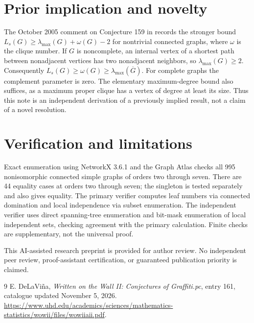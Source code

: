 \documentclass[11pt]{article}
\begin{document}
\section{Prior implication and novelty}
The October 2005 comment on Conjecture 159 in \cite{wow} records the stronger bound $L_s(G)\ge\lambda_{\max}(G)+\omega(G)-2$ for nontrivial connected graphs, where $\omega$ is the clique number. If $G$ is noncomplete, an internal vertex of a shortest path between nonadjacent vertices has two nonadjacent neighbors, so $\lambda_{\max}(G)\ge2$. Consequently $L_s(G)\ge\omega(G)\ge\lambda_{\max}(\overline G)$. For complete graphs the complement parameter is zero. The elementary maximum-degree bound also suffices, as a maximum proper clique has a vertex of degree at least its size. Thus this note is an independent derivation of a previously implied result, not a claim of a novel resolution.
\section{Verification and limitations}
Exact enumeration using NetworkX 3.6.1 and the Graph Atlas checks all 995 nonisomorphic connected simple graphs of orders two through seven. There are 44 equality cases at orders two through seven; the singleton is tested separately and also gives equality. The primary verifier computes leaf numbers via connected domination and local independence via subset enumeration. The independent verifier uses direct spanning-tree enumeration and bit-mask enumeration of local independent sets, checking agreement with the primary calculation. Finite checks are supplementary, not the universal proof.

This AI-assisted research preprint is provided for author review. No independent peer review, proof-assistant certification, or guaranteed publication priority is claimed.
\begin{thebibliography}{9}
 E. DeLaVi\~na, \emph{Written on the Wall II: Conjectures of Graffiti.pc}, entry 161, catalogue updated November 5, 2026. \url{https://www.uhd.edu/academics/sciences/mathematics-statistics/wowii/files/wowiiaii.pdf}.
\end{thebibliography}
\end{document}
